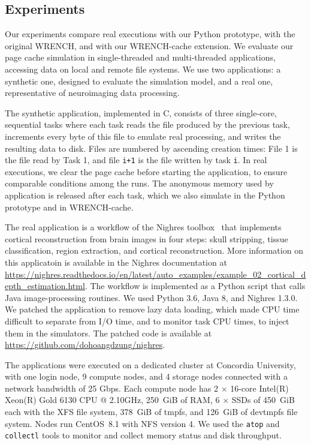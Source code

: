 \documentclass[conference]{IEEEtran}
\newcommand{\wrench}{WRENCH\xspace}
\begin{document}
        \subsection{Experiments}

        Our experiments compare real executions with our Python prototype,
        with the original \wrench, and with our \wrench-cache extension. We
        evaluate our page cache simulation in single-threaded and
        multi-threaded applications, accessing data on local and remote
        file systems. We use two applications: a synthetic one, designed to
        evaluate the simulation model, and a real one, representative of
        neuroimaging data processing.

        The synthetic application, implemented in C, consists of three single-core,
        sequential tasks where each task reads the file produced by the
        previous task, increments every byte of this file to emulate real
        processing, and writes the resulting data to disk. Files are
        numbered by ascending creation times: File 1 is the file read by Task 1, and file \texttt{i+1} is the file
        written by task \texttt{i}. In real executions, we clear the page
        cache before starting the application, to ensure comparable
        conditions among the runs. The anonymous memory used by application
        is released after each task, which we also simulate in the Python
        prototype and in WRENCH-cache.
        
        The real application is a workflow of the Nighres
        toolbox~\cite{huntenburg2018nighres} that implements
        cortical reconstruction from brain images in four steps: skull stripping, tissue classification, 
        region extraction, and cortical reconstruction. More information 
        on this applicatoin is available in the Nighres documentation at \url{https://nighres.readthedocs.io/en/latest/auto_examples/example_02_cortical_depth_estimation.html}.
        The workflow is implemented as a Python
        script that calls Java image-processing routines. We used Python
        3.6, Java 8, and Nighres 1.3.0. We patched the
        application to remove lazy data loading, which made CPU time difficult to separate from I/O time, 
        and to monitor task CPU times, to inject them in the simulators. The patched code is 
        available at \url{https://github.com/dohoangdzung/nighres}.

        The applications were executed on a dedicated cluster at
        Concordia University, with one login node, 9 compute nodes, and 4
        storage nodes connected with a network bandwidth of 25 Gbps. Each
        compute node has 2 $\times$ 16-core Intel(R) Xeon(R) Gold 6130 CPU
        @ 2.10GHz, 250~GiB of RAM, 6 $\times$ SSDs of 450~GiB each with the XFS
        file system, 378~GiB of tmpfs, and 126~GiB of devtmpfs file system.
        Nodes run CentOS~8.1 with NFS version 4. We used the \texttt{atop}
        and \texttt{collectl} tools to monitor and collect memory status
        and disk throughput.
\end{document}
